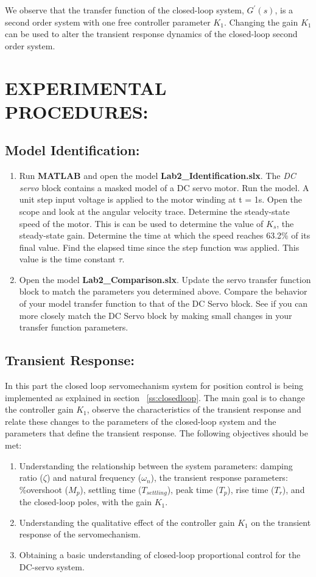\documentclass[11pt,a4paper]{article}
\begin{document}
We observe that the transfer function of the closed-loop system, $G^{\prime}(s)$, is a second order system with one free controller parameter $K_{1}$. Changing the gain $K_{1}$ can be used to alter the transient response dynamics of the closed-loop second order system.

\section{EXPERIMENTAL PROCEDURES:}
\subsection{Model Identification:}
\begin{enumerate}
\item Run \textbf{MATLAB} and open the model \textbf{Lab2\_Identification.slx}. The \textit{DC servo} block contains a masked model of a DC servo motor. Run the model. A unit step input voltage is applied to the motor winding at t = 1s. Open the scope and look at the angular velocity trace. Determine the steady-state speed of the motor. This is can be used to determine the value of $K_{s}$, the steady-state gain. Determine the time at which the speed reaches 63.2\% of its final value. Find the elapsed time since the step function was applied. This value is the time constant $\tau$.
\item Open the model \textbf{Lab2\_Comparison.slx}. Update the servo transfer function block to match the parameters you determined above. Compare the behavior of your model transfer function to that of the DC Servo block. See if you can more closely match the DC Servo block by making small changes in your transfer function parameters.
\end{enumerate}

\subsection{Transient Response:}
In this part the closed loop servomechanism system for position control is being implemented as explained in section ~\ref{ss:closedloop}. The main goal is to change the controller gain $K_{1}$, observe the characteristics of the transient response and relate these changes to the parameters of the closed-loop system and the parameters that define the transient response.
The following objectives should be met:
\begin{enumerate}
\item Understanding the relationship between the system parameters: damping ratio ($\zeta$) and natural frequency ($\omega_{n}$), the transient response parameters: \%overshoot ($M_{p}$), settling time ($T_{settling}$), peak time ($T_{p}$), rise time ($T_{r}$), and the closed-loop poles, with the gain $K_{1}$.

\item Understanding the qualitative effect of the controller gain $K_{1}$ on the transient response of the servomechanism.

\item Obtaining a basic understanding of closed-loop proportional control for the DC-servo system.
\end{enumerate}
\end{document}
